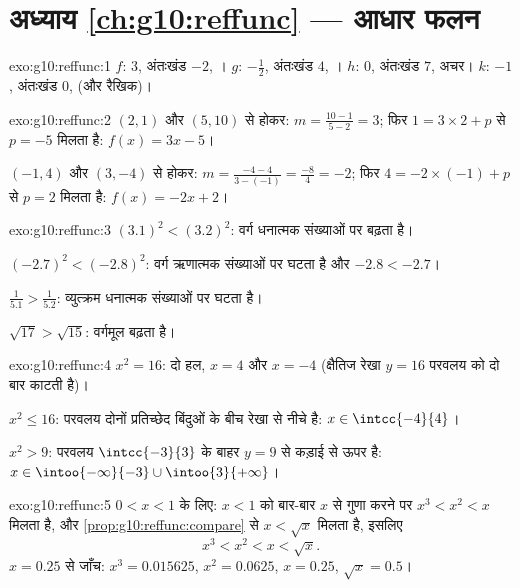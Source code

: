 \section*{अध्याय \ref{ch:g10:reffunc} --- आधार फलन}

\begin{solution}{exo:g10:reffunc:1}
$f$:  $3$, अंतःखंड $-2$, । \quad
$g$:  $-\frac12$, अंतःखंड $4$, । \quad
$h$:  $0$, अंतःखंड $7$, अचर। \quad
$k$:  $-1$, अंतःखंड $0$,  (और रैखिक)।
\end{solution}

\begin{solution}{exo:g10:reffunc:2}
$(2,1)$ और $(5,10)$ से होकर:  $m = \frac{10 - 1}{5 - 2} = 3$; फिर $1 = 3 \times 2 + p$ से $p = -5$ मिलता है: $f(x) = 3x - 5$।

$(-1,4)$ और $(3,-4)$ से होकर:  $m = \frac{-4 - 4}{3 - (-1)} =
\frac{-8}{4} = -2$; फिर $4 = -2 \times (-1) + p$ से $p = 2$ मिलता है: $f(x) = -2x + 2$।
\end{solution}

\begin{solution}{exo:g10:reffunc:3}
$(3.1)^2 < (3.2)^2$: वर्ग धनात्मक संख्याओं पर बढ़ता है।

$(-2.7)^2 < (-2.8)^2$: वर्ग ऋणात्मक संख्याओं पर घटता है और $-2.8 < -2.7$।

$\frac{1}{5.1} > \frac{1}{5.2}$: व्युत्क्रम धनात्मक संख्याओं पर घटता है।

$\sqrt{17} > \sqrt{15}$: वर्गमूल बढ़ता है।
\end{solution}

\begin{solution}{exo:g10:reffunc:4}
$x^2 = 16$: दो हल, $x = 4$ और $x = -4$ (क्षैतिज रेखा $y = 16$ परवलय को दो बार काटती है)।

$x^2 \leq 16$: परवलय दोनों प्रतिच्छेद बिंदुओं के बीच रेखा से नीचे है: $x \in \intcc{-4}{4}$।

$x^2 > 9$: परवलय $\intcc{-3}{3}$ के बाहर $y = 9$ से कड़ाई से ऊपर है: $x \in \intoo{-\infty}{-3} \cup \intoo{3}{+\infty}$।
\end{solution}

\begin{solution}{exo:g10:reffunc:5}
$0 < x < 1$ के लिए: $x < 1$ को बार-बार $x$ से गुणा करने पर $x^3 < x^2 < x$ मिलता है, और \cref{prop:g10:reffunc:compare} से
$x < \sqrt x$ मिलता है, इसलिए
\[
x^3 < x^2 < x < \sqrt x .
\]
$x = 0.25$ से जाँच: $x^3 = 0.015625$, $x^2 = 0.0625$, $x = 0.25$, $\sqrt x = 0.5$।
\end{solution}

